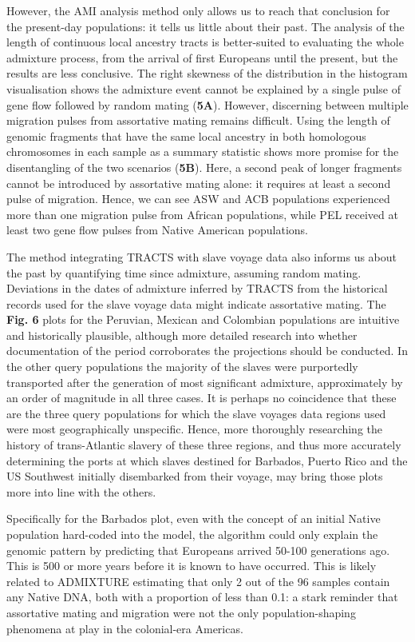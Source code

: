 \documentclass[11pt]{article}
\begin{document}
However, the AMI analysis method only allows us to reach that conclusion for the present-day populations: it tells us little about their past. The analysis of the length of continuous local ancestry tracts is better-suited to evaluating the whole admixture process, from the arrival of first Europeans until the present, but the results are less conclusive. The right skewness of the distribution in the histogram visualisation shows the admixture event cannot be explained by a single pulse of gene flow followed by random mating (\textbf{5A}). However, discerning between multiple migration pulses from assortative mating remains difficult. Using the length of genomic fragments that have the same local ancestry in both homologous chromosomes in each sample as a summary statistic shows more promise for the disentangling of the two scenarios (\textbf{5B}). Here, a second peak of longer fragments cannot be introduced by assortative mating alone: it requires at least a second pulse of migration. Hence, we can see ASW and ACB populations experienced more than one migration pulse from African populations, while PEL received at least two gene flow pulses from Native American populations.

The method integrating TRACTS with slave voyage data also informs us about the past by quantifying time since admixture, assuming random mating. Deviations in the dates of admixture inferred by TRACTS from the historical records used for the slave voyage data might indicate assortative mating. The \textbf{Fig. 6} plots for the Peruvian, Mexican and Colombian populations are intuitive and historically plausible, although more detailed research into whether documentation of the period corroborates the projections should be conducted.
In the other query populations the majority of the slaves were purportedly transported after the generation of most significant admixture, approximately by an order of magnitude in all three cases. It is perhaps no coincidence that these are the three query populations for which the slave voyages data regions used were most geographically unspecific. Hence, more thoroughly researching the history of trans-Atlantic slavery of these three regions, and thus more accurately determining the ports at which slaves destined for Barbados, Puerto Rico and the US Southwest initially disembarked from their voyage, may bring those plots more into line with the others. 

Specifically for the Barbados plot, even with the concept of an initial Native population hard-coded into the model, the algorithm could only explain the genomic pattern by predicting that Europeans arrived 50-100 generations ago. This is 500 or more years before it is known to have occurred. This is likely related to ADMIXTURE estimating that only 2 out of the 96 samples contain any Native DNA, both with a proportion of less than 0.1: a stark reminder that assortative mating and migration were not the only population-shaping phenomena at play in the colonial-era Americas.
\end{document}
